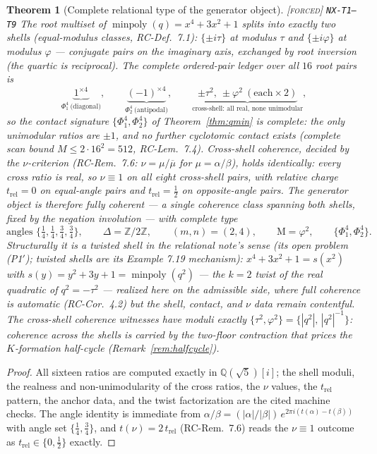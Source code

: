 \documentclass[11pt]{article}
\newcommand{\tagF}{\textcolor{cF}{\textsc{[forced]}}}
\newcommand{\hx}[1]{\textcolor{cC}{\footnotesize\texttt{#1}}}
\newcommand{\Q}{\mathbb{Q}}
\newcommand{\Z}{\mathbb{Z}}
\newcommand{\gp}{\varphi}
\newcommand{\M}{\mathrm{M}}
\theoremstyle{plain}
\newtheorem{theorem}{Theorem}[section]
\theoremstyle{definition}
\theoremstyle{remark}
\begin{document}
\begin{theorem}[Complete relational type of the generator object]\label{thm:reltype}\tagF{} \hx{NX-T1--T9}
The root multiset of $\operatorname{minpoly}(q)=x^4+3x^2+1$ splits into
exactly two shells (equal-modulus classes, RC-Def.\ 7.1): $\{\pm i\tau\}$ at
modulus $\tau$ and $\{\pm i\gp\}$ at modulus $\gp$ --- conjugate pairs on
the imaginary axis, exchanged by root inversion (the quartic is reciprocal).
The complete ordered-pair ledger over all $16$ root pairs is
\[
\underbrace{1^{\times4}}_{\Phi_1^{4}\ \text{(diagonal)}},\qquad
\underbrace{(-1)^{\times4}}_{\Phi_2^{4}\ \text{(antipodal)}},\qquad
\underbrace{\pm\tau^2,\ \pm\gp^2\ (\text{each}\times2)}_{\text{cross-shell: all real, none unimodular}},
\]
so the contact signature $\{\Phi_1^{4},\Phi_2^{4}\}$ of
Theorem~\ref{thm:qmin} is \emph{complete}: the only unimodular ratios are
$\pm1$, and no further cyclotomic contact exists (complete scan bound
$M\le2\cdot16^2=512$, RC-Lem.\ 7.4). Cross-shell coherence, decided by the
$\nu$-criterion (RC-Rem.\ 7.6: $\nu=\mu/\overline\mu$ for
$\mu=\alpha/\beta$), holds \emph{identically}: every cross ratio is real,
so $\nu\equiv1$ on all eight cross-shell pairs, with relative charge
$t_{\mathrm{rel}}=0$ on equal-angle pairs and $t_{\mathrm{rel}}=\tfrac12$
on opposite-angle pairs. The generator object is therefore \emph{fully
coherent} --- a single coherence class spanning both shells, fixed by the
negation involution --- with complete type
\[
\text{angles }\{\tfrac14,\tfrac14,\tfrac34,\tfrac34\},\qquad
\Delta=\Z/2\Z,\qquad (m,n)=(2,4),\qquad \M=\gp^2,\qquad
\{\Phi_1^{4},\Phi_2^{4}\}.
\]
Structurally it is a \emph{twisted shell} in the relational note's sense
(its open problem (P1$'$); twisted shells are its Example 7.19 mechanism):
$x^4+3x^2+1=s(x^2)$ with $s(y)=y^2+3y+1=\operatorname{minpoly}(q^2)$ ---
the $k=2$ twist of the real quadratic of $q^2=-\tau^2$ --- realized here on
the \emph{admissible} side, where full coherence is automatic
(RC-Cor.\ 4.2) but the shell, contact, and $\nu$ data remain contentful.
The cross-shell coherence witnesses have moduli exactly
$\{\tau^2,\gp^2\}=\{|q^2|,\,|q^2|^{-1}\}$: coherence across the shells is
carried by the two-floor contraction that prices the $K$-formation
half-cycle (Remark~\ref{rem:halfcycle}).
\end{theorem}

\begin{proof}
All sixteen ratios are computed exactly in $\Q(\sqrt5)[i]$; the shell
moduli, the realness and non-unimodularity of the cross ratios, the $\nu$
values, the
$t_{\mathrm{rel}}$ pattern, the anchor data, and the twist factorization
are the cited machine checks. The angle identity is immediate from
$\alpha/\beta=(|\alpha|/|\beta|)\,e^{2\pi i(t(\alpha)-t(\beta))}$ with
angle set $\{\tfrac14,\tfrac34\}$, and $t(\nu)=2\,t_{\mathrm{rel}}$
(RC-Rem.\ 7.6) reads the $\nu\equiv1$ outcome as
$t_{\mathrm{rel}}\in\{0,\tfrac12\}$ exactly.
\end{proof}
\end{document}
